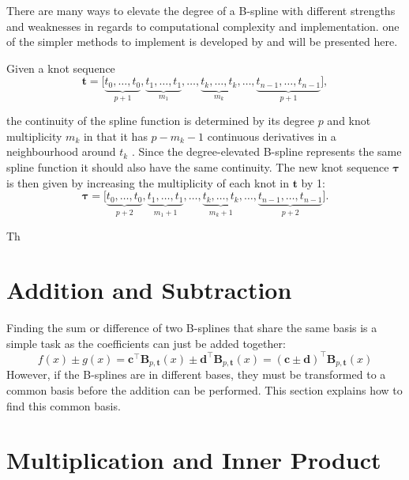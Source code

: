 There are many ways to elevate the degree of a B-spline \citep{piegl1994,Prautzsch1984,lee2000degree} with different strengths and weaknesses in regards to computational complexity and implementation. one of the simpler methods to implement is developed by \cite{Cohen1986} and will be presented here.

Given a knot sequence
\begin{equation}
    \mathbf t = \big[\underbrace{t_0, \ldots, t_0}_{p+1}, \underbrace{t_1, \ldots, t_1}_{m_1}, \ldots, \underbrace{t_k, \ldots, t_k}_{m_k}, \ldots, \underbrace{t_{n-1}, \ldots, t_{n-1}}_{p+1}\big],
\end{equation}

the continuity of the spline function is determined by its degree $p$ and knot multiplicity $m_k$ in that it has $p-m_k-1$ continuous derivatives in a neighbourhood around $t_k$ \citep{Cohen1986}.
Since the degree-elevated B-spline represents the same spline function it should also have the same continuity. The new knot sequence $\boldsymbol \tau$ is then given by increasing the multiplicity of each knot in $\mathbf t$ by 1:
\begin{equation}
    \boldsymbol \tau = \big[\underbrace{t_0, \ldots, t_0}_{p+2}, \underbrace{t_1, \ldots, t_1}_{m_1+1}, \ldots, \underbrace{t_k, \ldots, t_k}_{m_k+1}, \ldots, \underbrace{t_{n-1}, \ldots, t_{n-1}}_{p+2}\big].
\end{equation}

Th


\section{Addition and Subtraction}

Finding the sum or difference of two B-splines that share the same basis is a simple task as the coefficients can just be added together:
\begin{equation}
    f(x) \pm g(x) = \mathbf{c}^{\top} \mathbf{B}_{p, \mathbf{t}}(x) \pm \mathbf{d}^{\top} \mathbf{B}_{p, \mathbf{t}}(x) 
    =(\mathbf{c} \pm \mathbf{d})^{\top} \mathbf{B}_{p, \mathbf{t}}(x)
\end{equation}
However, if the B-splines are in different bases, they must be transformed to a common basis before the addition can be performed. This section explains how to find this common basis.



\section{Multiplication and Inner Product}

